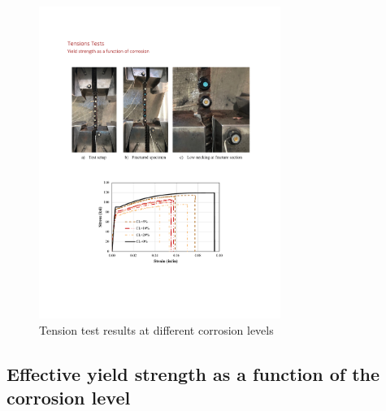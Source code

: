 \begin{figure}[htbp]
	\centering
	\includegraphics[width=0.7\textwidth]{VAC Thesis 2.0/Chapter-4/figs/TensionTest_results_1.pdf}
	\caption{Tension test results at different corrosion levels}
	\label{fig:TensionTestResults_StressStrain}
\end{figure}

\subsection{Effective yield strength as a function of the corrosion level}

